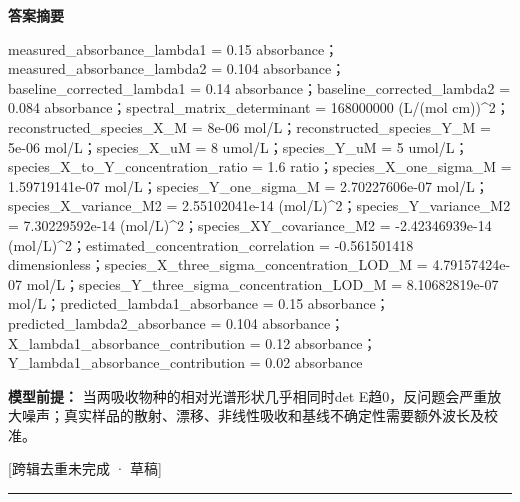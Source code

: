 \documentclass[UTF8,11pt,a4paper]{ctexart}
\begin{document}
\noindent\textbf{答案摘要}\par
measured\_absorbance\_lambda1 = 0.15 absorbance；measured\_absorbance\_lambda2 = 0.104 absorbance；baseline\_corrected\_lambda1 = 0.14 absorbance；baseline\_corrected\_lambda2 = 0.084 absorbance；spectral\_matrix\_determinant = 168000000 (L/(mol cm))\textasciicircum{}2；reconstructed\_species\_X\_M = 8e-06 mol/L；reconstructed\_species\_Y\_M = 5e-06 mol/L；species\_X\_uM = 8 umol/L；species\_Y\_uM = 5 umol/L；species\_X\_to\_Y\_concentration\_ratio = 1.6 ratio；species\_X\_one\_sigma\_M = 1.59719141e-07 mol/L；species\_Y\_one\_sigma\_M = 2.70227606e-07 mol/L；species\_X\_variance\_M2 = 2.55102041e-14 (mol/L)\textasciicircum{}2；species\_Y\_variance\_M2 = 7.30229592e-14 (mol/L)\textasciicircum{}2；species\_XY\_covariance\_M2 = -2.42346939e-14 (mol/L)\textasciicircum{}2；estimated\_concentration\_correlation = -0.561501418 dimensionless；species\_X\_three\_sigma\_concentration\_LOD\_M = 4.79157424e-07 mol/L；species\_Y\_three\_sigma\_concentration\_LOD\_M = 8.10682819e-07 mol/L；predicted\_lambda1\_absorbance = 0.15 absorbance；predicted\_lambda2\_absorbance = 0.104 absorbance；X\_lambda1\_absorbance\_contribution = 0.12 absorbance；Y\_lambda1\_absorbance\_contribution = 0.02 absorbance\par
\noindent\textbf{模型前提：}
当两吸收物种的相对光谱形状几乎相同时det E趋0，反问题会严重放大噪声；真实样品的散射、漂移、非线性吸收和基线不确定性需要额外波长及校准。\par
\noindent\textcolor{red!65!black}{[跨辑去重未完成 · 草稿]} \par
\medskip\hrule\medskip
{}
\end{document}
